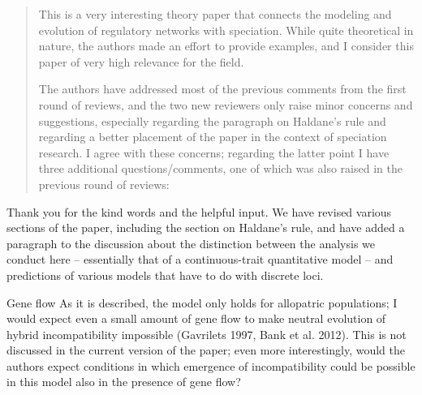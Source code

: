 \begin{quote}
This is a very interesting theory paper that connects the modeling and evolution of regulatory networks with speciation. While quite theoretical in nature, the authors made an effort to provide examples, and I consider this paper of very high relevance for the field.

The authors have addressed most of the previous comments from the first round of reviews, and the two new reviewers only raise minor concerns and suggestions, especially regarding the paragraph on Haldane’s rule and regarding a better placement of the paper in the context of speciation research. I agree with these concerns; regarding the latter point I have three additional questions/comments, one of which was also raised in the previous round of reviews:
\end{quote}

Thank you for the kind words and the helpful input.
We have revised various sections of the paper,
including the section on Haldane's rule,
and have added a paragraph to the discussion about the distinction between
the analysis we conduct here -- essentially that of a continuous-trait quantitative model --
and predictions of various models that have to do with discrete loci.

\begin{point}{Gene flow}
As it is described, the model only holds for allopatric populations; I would expect even a small amount of gene flow to make neutral evolution of hybrid incompatibility impossible (Gavrilets 1997, Bank et al. 2012). This is not discussed in the current version of the paper; even more interestingly, would the authors expect conditions in which emergence of incompatibility could be possible in this model also in the presence of gene flow?
\end{point}


